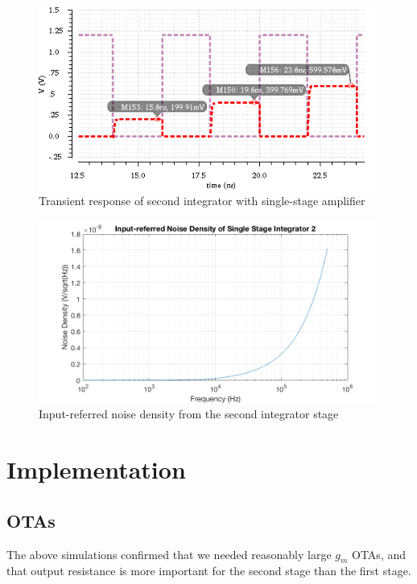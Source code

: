 \documentclass[conference]{IEEEtran}
\begin{document}
\begin{figure}[h]
\centering
\includegraphics[width=\linewidth]{img/stage2-tran}
\caption{Transient response of second integrator with single-stage amplifier}
\label{stage2-tran}
\end{figure}

\begin{figure}[h]
\centering
\includegraphics[width=\linewidth]{img/noise-stage2}
\caption{Input-referred noise density from the second integrator stage}
\label{noise-stage2}
\end{figure}


\section{Implementation}

\subsection{OTAs}
The above simulations confirmed that we needed reasonably large $g_m$ OTAs, and that output resistance is more important for the second stage than the first stage.
\end{document}
